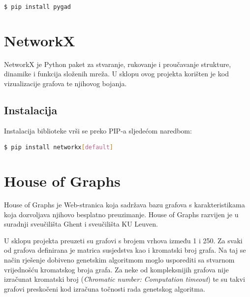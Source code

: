 \documentclass[times, utf8, zavrsni, numeric]{fer}
\begin{document}
\begin{lstlisting}[language=bash]
  $ pip install pygad
\end{lstlisting}

\section{NetworkX}
NetworkX je Python paket za stvaranje, rukovanje i proučavanje strukture, dinamike i funkcija složenih mreža. U sklopu ovog projekta korišten je kod vizualizacije grafova te njihovog bojanja.

\subsection{Instalacija}
Instalacija biblioteke vrši se preko PIP-a sljedećom naredbom:

\begin{lstlisting}[language=bash]
  $ pip install networkx[default]
\end{lstlisting}

\section{House of Graphs}
\label{sec:house of graphs}
House of Graphs \cite{houseofgraphs} je Web-stranica koja sadržava bazu grafova s karakteristikama koja dozvoljava njihovo besplatno preuzimanje. House of Graphs razvijen je u suradnji sveučilišta Ghent i sveučilišta KU Leuven.

U sklopu projekta preuzeti su grafovi s brojem vrhova između 1 i 250. Za svaki od grafova definirana je matrica susjedstva kao i kromatski broj grafa. Na taj se način rješenje dobiveno genetskim algoritmom moglo usporediti sa stvarnom vrijednošću kromatskog broja grafa. Za neke od kompleksnijih grafova nije izračunat kromatski broj (\textit{Chromatic number: Computation timeout}) te su takvi grafovi preskočeni kod izračuna točnosti rada genetskog algoritma.
\end{document}
